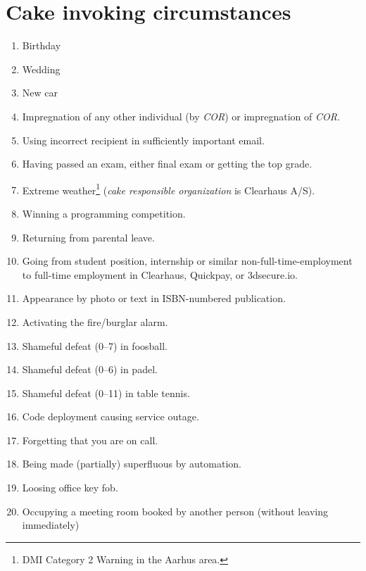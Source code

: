 \documentclass[a4paper, oneside, article]{memoir}
\newcounter{tbc}
\begin{document}
\chapter{Cake invoking circumstances}\label{chp:circumstances}
\begin{enumerate}[§ 1]
  \setcounter{enumi}{\value{tbc}}

  \item Birthday
  \item Wedding
  \item New car
  \item Impregnation of any other individual (by \emph{COR}) or impregnation of
    \emph{COR}.
  \item Using incorrect recipient in sufficiently important email.
  \item Having passed an exam, either final exam or getting the top grade.
  \item Extreme weather\footnote{DMI Category 2 Warning in the Aarhus area.} (\emph{cake responsible organization} is Clearhaus A/S).
  \item Winning a programming competition.
  \item Returning from parental leave.
  \item Going from student position, internship or similar non-full-time-employment to full-time employment in Clearhaus, Quickpay, or 3dsecure.io.
  \item Appearance by photo or text in ISBN-numbered publication.
  \item Activating the fire/burglar alarm.
  \item Shameful defeat (0--7) in foosball.
  \item Shameful defeat (0--6) in padel.
  \item Shameful defeat (0--11) in table tennis.
  \item Code deployment causing service outage.
  \item Forgetting that you are on call.
  \item Being made (partially) superfluous by automation.
  \item Loosing office key fob.
  \item Occupying a meeting room booked by another person (without leaving immediately)
\end{enumerate}
\end{document}
